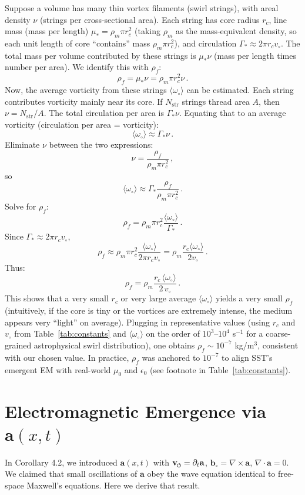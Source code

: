 \documentclass[reprint,aps,onecolumn,nofootinbib]{revtex4-2}
\newcommand{\swirlarrow}{%
    \mathchoice{\mkern-2mu\scriptstyle\boldsymbol{\circlearrowleft}}%
    {\mkern-2mu\scriptstyle\boldsymbol{\circlearrowleft}}%
    {\mkern-2mu\scriptscriptstyle\boldsymbol{\circlearrowleft}}%
    {\mkern-2mu\scriptscriptstyle\boldsymbol{\circlearrowleft}}%
}
\newcommand{\vswirl}{\mathbf{v}_{\swirlarrow}}
\begin{document}
	Suppose a volume has many thin vortex filaments (swirl strings), with areal density $\nu$ (strings per cross-sectional area). Each string has core radius $r_c$, line mass (mass per length) $\mu_* = \rho_m \pi r_c^2$ (taking $\rho_m$ as the mass-equivalent density, so each unit length of core “contains” mass $\rho_m \pi r_c^2$), and circulation $\Gamma_* \approx 2\pi r_c v_{\circ}$. The total mass per volume contributed by these strings is $\mu_*\nu$ (mass per length times number per area). We identify this with $\rho_f$:
	\[
		\rho_f = \mu_* \nu = \rho_m \pi r_c^2 \nu\,.
	\]
	Now, the average vorticity from these strings $\langle \omega_{\circ}\rangle$ can be estimated. Each string contributes vorticity mainly near its core. If $N_{\text{str}}$ strings thread area $A$, then $\nu = N_{\text{str}}/A$. The total circulation per area is $\Gamma_* \nu$. Equating that to an average vorticity (circulation per area = vorticity):
	\[
		\langle \omega_{\circ} \rangle \approx \Gamma_* \nu\,.
	\]
	Eliminate $\nu$ between the two expressions:
	\[
		\nu = \frac{\rho_f}{\rho_m \pi r_c^2}\,,
	\]
	so
	\[
		\langle \omega_{\circ} \rangle \approx \Gamma_* \frac{\rho_f}{\rho_m \pi r_c^2}\,.
	\]
	Solve for $\rho_f$:
	\[
		\rho_f = \rho_m \pi r_c^2 \frac{\langle \omega_{\circ}\rangle}{\Gamma_*}\,.
	\]
	Since $\Gamma_* \approx 2\pi r_c v_{\circ}$,
	\[
		\rho_f \approx \rho_m \pi r_c^2 \frac{\langle \omega_{\circ}\rangle}{2\pi r_c v_{\circ}} = \rho_m \frac{r_c \langle \omega_{\circ}\rangle}{2 v_{\circ}}\,.
	\]
	Thus:
	\[
		\rho_f = \rho_m \frac{r_c\,\langle \omega_{\circ}\rangle}{2\,v_{\circ}}\,.
	\]
	This shows that a very small $r_c$ or very large average $\langle \omega_{\circ}\rangle$ yields a very small $\rho_f$ (intuitively, if the core is tiny or the vortices are extremely intense, the medium appears very “light” on average). Plugging in representative values (using $r_c$ and $v_{\circ}$ from Table~\ref{tab:constants} and $\langle \omega_{\circ}\rangle$ on the order of $10^3$–$10^4$ s$^{-1}$ for a coarse-grained astrophysical swirl distribution), one obtains $\rho_f \sim 10^{-7}$ kg/m$^3$, consistent with our chosen value. In practice, $\rho_f$ was anchored to $10^{-7}$ to align SST’s emergent EM with real-world $\mu_0$ and $\epsilon_0$ (see footnote in Table~\ref{tab:constants}).

	\section{Electromagnetic Emergence via $\mathbf{a}(x,t)$}
	In Corollary 4.2, we introduced $\mathbf{a}(x,t)$ with $\vswirl = \partial_t \mathbf{a}$, $\mathbf{b}_{\circ} = \nabla \times \mathbf{a}$, $\nabla \cdot \mathbf{a}=0$. We claimed that small oscillations of $\mathbf{a}$ obey the wave equation identical to free-space Maxwell’s equations. Here we derive that result.
\end{document}
